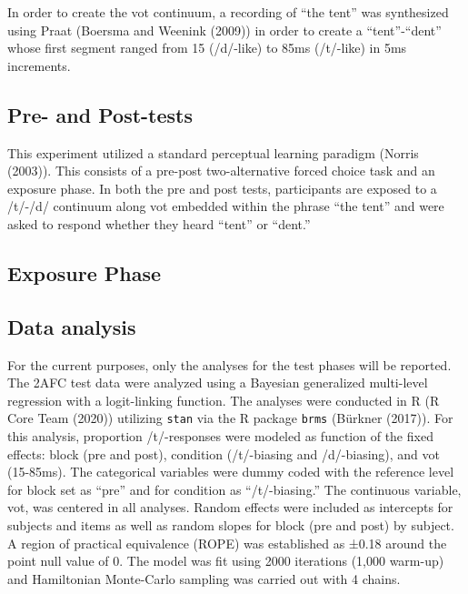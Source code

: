 \documentclass[
  english,
  man]{apa6}
\begin{document}
In order to create the vot continuum, a recording of ``the tent'' was synthesized using Praat (Boersma and Weenink (2009)) in order to create a ``tent''-``dent'' whose first segment ranged from 15 (/d/-like) to 85ms (/t/-like) in 5ms increments.

\hypertarget{pre--and-post-tests}{%
\subsection{Pre- and Post-tests}\label{pre--and-post-tests}}

This experiment utilized a standard perceptual learning paradigm (Norris (2003)). This consists of a pre-post two-alternative forced choice task and an exposure phase. In both the pre and post tests, participants are exposed to a /t/-/d/ continuum along vot embedded within the phrase ``the tent'' and were asked to respond whether they heard ``tent'' or ``dent.''

\hypertarget{exposure-phase}{%
\subsection{Exposure Phase}\label{exposure-phase}}

\hypertarget{data-analysis}{%
\subsection{Data analysis}\label{data-analysis}}

For the current purposes, only the analyses for the test phases will be reported. The 2AFC test data were analyzed using a Bayesian generalized multi-level regression with a logit-linking function. The analyses were conducted in R (R Core Team (2020)) utilizing \texttt{stan} via the R package \texttt{brms} (Bürkner (2017)). For this analysis, proportion /t/-responses were modeled as function of the fixed effects: block (pre and post), condition (/t/-biasing and /d/-biasing), and vot (15-85ms). The categorical variables were dummy coded with the reference level for block set as ``pre'' and for condition as ``/t/-biasing.'' The continuous variable, vot, was centered in all analyses. Random effects were included as intercepts for subjects and items as well as random slopes for block (pre and post) by subject. A region of practical equivalence (ROPE) was established as ±0.18 around the point null value of 0. The model was fit using 2000 iterations (1,000 warm-up) and Hamiltonian Monte-Carlo sampling was carried out with 4 chains.
\end{document}
